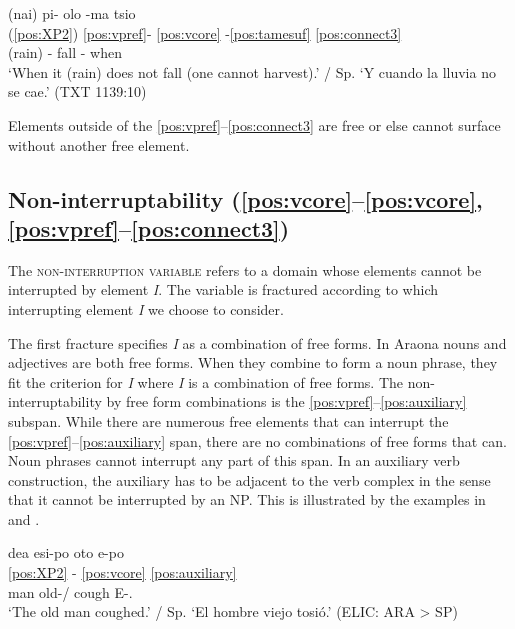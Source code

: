 \documentclass[output=paper,hidelinks]{langscibook}
\begin{document}
\ea \label{ex:pioloma}
    \glll (nai)	pi- olo -ma tsio  \\
		(\ref{pos:XP2}) \ref{pos:vpref}- \ref{pos:vcore} -\ref{pos:tamesuf} \ref{pos:connect3} \\
		(rain) \Neg{}- fall -\Neg{} when  \\
	\glt `When it (rain) does not fall (one cannot harvest).' / Sp. `Y cuando la lluvia no se cae.' \hfill (TXT 1139:10)
\z

Elements outside of the \ref{pos:vpref}--\ref{pos:connect3} are free or else cannot surface without another free element.



\subsection{Non-interruptability (\ref{pos:vcore}--\ref{pos:vcore},\ref{pos:vpref}--\ref{pos:connect3})}
\label{sec:non-interruptability}

The \textsc{non-interruption variable} refers to a domain whose elements cannot be interrupted by element \textit{I}. The variable is fractured according to which interrupting element \textit{I} we choose to consider.

The first fracture specifies \textit{I} as a combination of free forms. In Araona nouns and adjectives are both free forms. When they combine to form a noun phrase, they fit the criterion for \textit{I} where \textit{I} is a combination of free forms. The non-interruptability by free form combinations is the \ref{pos:vpref}--\ref{pos:auxiliary} subspan. While there are numerous free elements that can interrupt the \ref{pos:vpref}--\ref{pos:auxiliary} span, there are no combinations of free forms that can. Noun phrases cannot interrupt any part of this span. In an auxiliary verb construction, the auxiliary has to be adjacent to the verb complex in the sense that it cannot be interrupted by an NP. This is illustrated by the examples in  and .

\ea \label{ex:otopipoma}
    \glll  dea esi-po oto e-po \\
    \ref{pos:XP2} - \ref{pos:vcore} \ref{pos:auxiliary} \\
    man old-\Rel{}/\Nmlz{} cough E-\Aux{}.\Intr{}  \\
    \glt `The old man coughed.' / Sp. `El hombre viejo tosió.'  \hfill (ELIC: ARA > SP)
\z 

\end{document}
